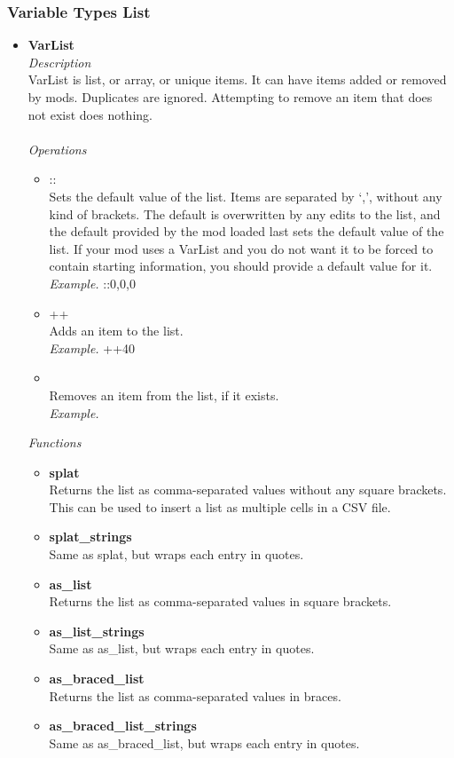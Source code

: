 \documentclass{article}
\begin{document}
\subsubsection{Variable Types List}\label{Section:VariableTypesList}
\begin{itemize}
\item \textbf{VarList}\\
\textit{Description}\\
VarList is list, or array, or unique items. It can have items added or removed by mods. Duplicates are ignored. Attempting to remove an item that does not exist does nothing.\\\\
\textit{Operations}
\begin{itemize}
	\item ::\\
	Sets the default value of the list. Items are separated by `,', without any kind of brackets. The default is overwritten by any edits to the list, and the default provided by the mod loaded last sets the default value of the list. If your mod uses a VarList and you do not want it to be forced to contain starting information, you should provide a default value for it.\\
	\textit{Example.} ::0,0,0
	\item ++\\
	Adds an item to the list.\\
	\textit{Example.} ++40
	\item \textminus\textminus\\
	Removes an item from the list, if it exists.\\
	\textit{Example.}  \textminus{}
\end{itemize}
\textit{Functions}
\begin{itemize}
\item \textbf{splat}\\
Returns the list as comma-separated values without any square brackets. This can be used to insert a list as multiple cells in a CSV file.
\item \textbf{splat\_strings}\\
Same as splat, but wraps each entry in quotes.
\item \textbf{as\_list}\\
Returns the list as comma-separated values in square brackets.
\item \textbf{as\_list\_strings}\\
Same as as\_list, but wraps each entry in quotes.
\item \textbf{as\_braced\_list}\\
Returns the list as comma-separated values in braces.
\item \textbf{as\_braced\_list\_strings}\\
Same as as\_braced\_list, but wraps each entry in quotes.
\end{itemize}
\end{itemize}
\end{document}

